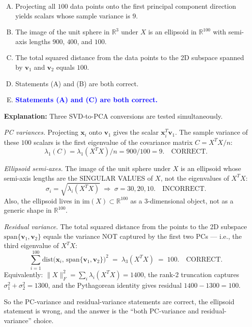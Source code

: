 \documentclass[12pt]{amsart}
\begin{document}
\begin{enumerate}[(A)]
\item Projecting all $100$ data points onto the first principal component
direction yields scalars whose sample variance is $9$.
\item The image of the unit sphere in $\mathbb{R}^3$ under $X$ is an ellipsoid
in $\mathbb{R}^{100}$ with semi-axis lengths $900$, $400$, and $100$.
\item The total squared distance from the data points to the 2D subspace spanned
by $\mathbf{v}_1$ and $\mathbf{v}_2$ equals $100$.
\item Statements (A) and (B) are both correct.
\item \textcolor{blue}{\textbf{Statements (A) and (C) are both correct.}}
\end{enumerate}

\textbf{Explanation:}
Three SVD-to-PCA conversions are tested simultaneously.

\emph{PC variances.} Projecting $\mathbf{x}_i$ onto $\mathbf{v}_1$ gives the
scalar $\mathbf{x}_i^T\mathbf{v}_1$. The sample variance of these $100$
scalars is the first eigenvalue of the covariance matrix $C = X^TX/n$:
$$\lambda_1(C) = \lambda_1(X^TX)/n = 900/100 = 9. \quad \text{CORRECT.}$$

\emph{Ellipsoid semi-axes.} The image of the unit sphere under $X$ is an
ellipsoid whose semi-axis lengths are the SINGULAR VALUES of $X$, not the
eigenvalues of $X^TX$:
$$\sigma_i = \sqrt{\lambda_i(X^TX)} \;\Rightarrow\; \sigma = 30, 20, 10. \quad \text{INCORRECT.}$$
Also, the ellipsoid lives in $\mathrm{im}(X) \subset \mathbb{R}^{100}$ as a
$3$-dimensional object, not as a generic shape in $\mathbb{R}^{100}$.

\emph{Residual variance.} The total squared distance from the points to the
2D subspace $\mathrm{span}\{\mathbf{v}_1, \mathbf{v}_2\}$ equals the variance
NOT captured by the first two PCs --- i.e., the third eigenvalue of $X^TX$:
$$\sum_{i=1}^{100} \mathrm{dist}\big(\mathbf{x}_i,\, \mathrm{span}\{\mathbf{v}_1,\mathbf{v}_2\}\big)^2
\;=\; \lambda_3(X^TX) \;=\; 100. \quad \text{CORRECT.}$$
Equivalently: $\|X\|_F^2 = \sum_i \lambda_i(X^TX) = 1400$, the rank-2
truncation captures $\sigma_1^2 + \sigma_2^2 = 1300$, and the Pythagorean
identity gives residual $1400 - 1300 = 100$.

So the PC-variance and residual-variance statements are correct,
the ellipsoid statement is wrong, and the answer is the ``both PC-variance
and residual-variance'' choice.
\end{document}
